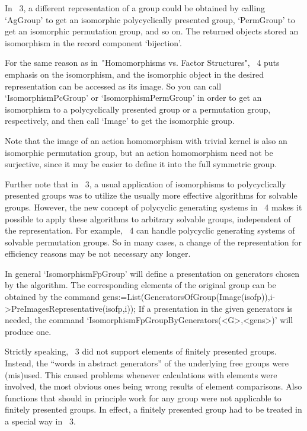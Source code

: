 In {\GAP}~3, a different representation of a group could be obtained by
calling `AgGroup' to get an isomorphic polycyclically presented group,
`PermGroup' to get an isomorphic permutation group, and so on.
The returned objects stored an isomorphism in the record component
`bijection'.

For the same reason as in~"Homomorphisms vs. Factor Structures",
{\GAP}~4 puts emphasis on the isomorphism,
and the isomorphic object in the desired representation can be accessed
as its image.
So you can call `IsomorphismPcGroup' or `IsomorphismPermGroup' in order
to get an isomorphism to a polycyclically presented group or a
permutation group, respectively, and then call `Image' to get the
isomorphic group.

Note that the image of an action homomorphism with trivial kernel is
also an isomorphic permutation group, but an action homomorphism need
not be surjective, since it may be easier to define it into the full
symmetric group.

Further note that in {\GAP}~3, a usual application of isomorphisms to
polycyclically presented groups was to utilize the usually more
effective algorithms for solvable groups.  However, the new concept of
polycyclic generating systems in {\GAP}~4 makes it possible to apply
these algorithms to arbitrary solvable groups, independent of the
representation.  For example, {\GAP}~4 can handle polycyclic
generating systems of solvable permutation groups.  So in many cases,
a change of the representation for efficiency reasons may be not
necessary any longer.

In general `IsomorphismFpGroup' will define a presentation on generators
chosen by the algorithm. The corresponding elements of the original
group can be obtained by the command
\begintt
gens:=List(GeneratorsOfGroup(Image(isofp)),i->PreImagesRepresentative(isofp,i));
\endtt
If a presentation in the given generators is needed, the command
`IsomorphismFpGroupByGenerators(<G>,<gens>)' will produce one.



Strictly speaking, {\GAP}~3 did not support elements of finitely
presented groups.  Instead, the ``words in abstract generators'' of
the underlying free groups were (mis)used.  This caused problems
whenever calculations with elements were involved, the most obvious
ones being wrong results of element comparisons.  Also functions
that should in principle work for any group were not applicable to
finitely presented groups.  In effect, a finitely presented group had
to be treated in a special way in {\GAP}~3.

